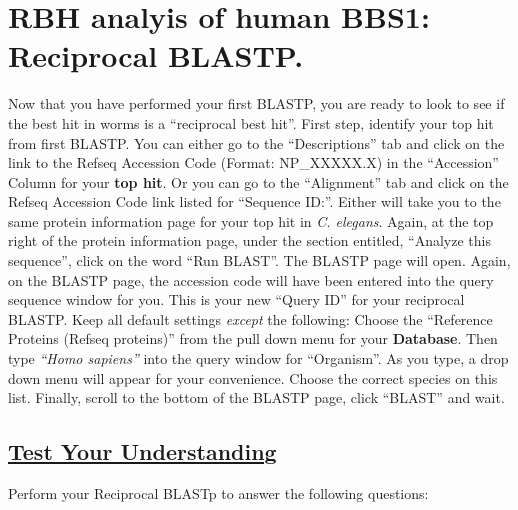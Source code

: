 \documentclass[
]{book}
\begin{document}
\hypertarget{rbh-analyis-of-human-bbs1-reciprocal-blastp.}{%
\section{RBH analyis of human BBS1: Reciprocal BLASTP.}\label{rbh-analyis-of-human-bbs1-reciprocal-blastp.}}

Now that you have performed your first BLASTP, you are ready to look to see if the best hit in worms is a ``reciprocal best hit''. First step, identify your top hit from first BLASTP. You can either go to the ``Descriptions'' tab and click on the link to the Refseq Accession Code (Format: NP\_XXXXX.X) in the ``Accession'' Column for your \textbf{top hit}. Or you can go to the ``Alignment'' tab and click on the Refseq Accession Code link listed for ``Sequence ID:''. Either will take you to the same protein information page for your top hit in \emph{C. elegans}. Again, at the top right of the protein information page, under the section entitled, ``Analyze this sequence'', click on the word ``Run BLAST''. The BLASTP page will open. Again, on the BLASTP page, the accession code will have been entered into the query sequence window for you. This is your new ``Query ID'' for your reciprocal BLASTP. Keep all default settings \emph{except} the following: Choose the ``Reference Proteins (Refseq proteins)'' from the pull down menu for your \textbf{Database}. Then type \emph{``Homo sapiens''} into the query window for ``Organism''. As you type, a drop down menu will appear for your convenience. Choose the correct species on this list. Finally, scroll to the bottom of the BLASTP page, click ``BLAST'' and wait.

\hypertarget{test-your-understanding-26}{%
\subsection{\texorpdfstring{\href{https://docs.google.com/forms/d/e/1FAIpQLSctC_EHT6uey1_zYviwwxNJRCgWAM-bKxlkiJawl5HfZk6siw/viewform?usp=sf_link}{Test Your Understanding}}{Test Your Understanding}}\label{test-your-understanding-26}}

Perform your Reciprocal BLASTp to answer the following questions:
\end{document}
